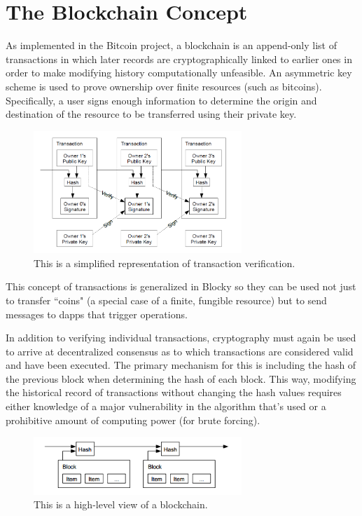 \documentclass[letterpaper]{article}
\begin{document}
\section{The Blockchain Concept}
As implemented in the Bitcoin project, a blockchain is an append-only list of transactions in which later records are cryptographically linked to earlier ones in order to make modifying history computationally unfeasible. An asymmetric key scheme is used to prove ownership over finite resources (such as bitcoins). Specifically, a user signs enough information to determine the origin and destination of the resource to be transferred using their private key.

\begin{figure}[h]
\centering
\includegraphics[width=0.7\textwidth]{transaction_chain.png}
\caption{\label{fig:transaction_chain}This is a simplified representation of transaction verification\cite{nakamoto09}.}
\end{figure}

This concept of transactions is generalized in Blocky so they can be used not just to transfer ``coins" (a special case of a finite, fungible resource) but to send messages to dapps that trigger operations.

In addition to verifying individual transactions, cryptography must again be used to arrive at decentralized consensus as to which transactions are considered valid and have been executed. The primary mechanism for this is including the hash of the previous block when determining the hash of each block. This way, modifying the historical record of transactions without changing the hash values requires either knowledge of a major vulnerability in the algorithm that's used or a prohibitive amount of computing power (for brute forcing).

\begin{figure}[h]
\centering
\includegraphics[width=0.7\textwidth]{blockchain.png}
\caption{\label{fig:blockchain}This is a high-level view of a blockchain\cite{nakamoto09}.}
\end{figure}
\end{document}
